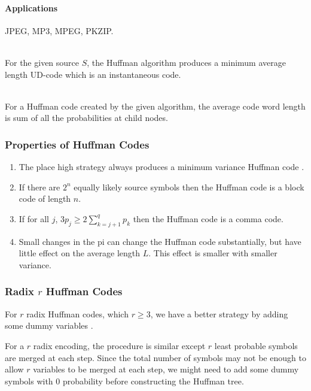 \documentclass{article}
\begin{document}
\paragraph{Applications} JPEG, MP3, MPEG, PKZIP.

\begin{theorem}
    \mbox{}\\
    For the given source $S$, the Huffman algorithm produces a minimum average length UD-code which is an instantaneous code.
\end{theorem}

\begin{proposition}[Knuth]
    \mbox{}\\
    For a Huffman code created by the given algorithm, the average code word length is sum of all the probabilities at child nodes.
\end{proposition}

\subsubsection{Properties of Huffman Codes}

\begin{enumerate}
    \item The place high strategy always produces a minimum variance Huffman code .
    \item If there are $2^{n}$ equally likely source symbols then the Huffman code is a block code of length $n$.
    \item If for all $j$, $3p_{j} \geq 2 \sum_{k=j+1}^{q}p_{k}$ then the Huffman code is a comma code.
    \item Small changes in the pi can change the Huffman code substantially, but have little effect on the average length $L$. This effect is smaller with smaller variance.
\end{enumerate}

\subsubsection{Radix $r$ Huffman Codes}
For $r$ radix Huffman codes, which $r \geq 3$, we have a better strategy by adding some dummy variables \cite{cmuLec8}.

For a $r$ radix encoding, the procedure is similar except $r$ least probable symbols are merged at each step. Since the total number of symbols may not be enough to allow $r$ variables to be merged at each step, we might need to add some dummy symbols with $0$ probability before constructing the Huffman tree.
\end{document}
